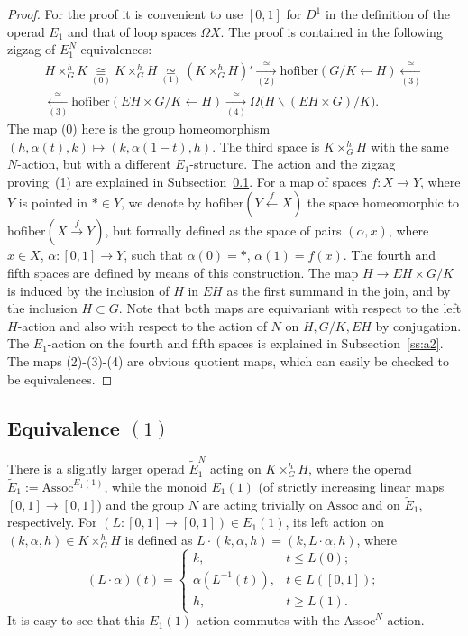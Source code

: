 \documentclass[11pt]{amsart}
\theoremstyle{definition}
\newcommand{\hofiber}{\mathrm{hofiber}}
\newcommand{\Assoc}{\mathrm{Assoc}}
\numberwithin{equation}{section}
\begin{document}
\begin{proof}
For the proof it is convenient to use $[0,1]$ for $D^1$  in the definition of the operad $E_1$ and that of loop spaces $\Omega X$. 
The proof is contained in the following zigzag of $E_1^N$-equivalences:
\begin{multline}\label{eq:zigzag_app}
H\times^h_G K\underset{(0)}{\cong} K\times^h_G H\underset{(1)}{\simeq}\left(K\times^h_G H\right)'\xrightarrow[(2)]{\simeq}
\hofiber\left(G/K\leftarrow H\right)\xleftarrow[(3)]{\simeq}\\
\xleftarrow[(3)]{\simeq}\hofiber\left(EH\times G/K\leftarrow H\right)\xrightarrow[(4)]{\simeq}\Omega\bigl(H\backslash (EH\times G)/K\bigr).
\end{multline}
The map (0) here is the group homeomorphism $(h,\alpha(t),k)\mapsto (k,\alpha(1-t),h)$. 
The third space is $K\times^h_G H$ with the same $N$-action, but with a different $E_1$-structure. The action and the zigzag
proving~(1)
are explained in Subsection~\ref{ss:a1}. For a map of spaces $f\colon X\to Y$, where $Y$ is pointed in $*\in Y$, we denote by
$\hofiber(Y\xleftarrow{f} X)$ the space homeomorphic to $\hofiber(X\stackrel{f}{\to} Y)$, but formally defined as the space of pairs $(\alpha,x)$,
where $x\in X$, $\alpha\colon [0,1]\to Y$, such that $\alpha(0)=*$, $\alpha(1)=f(x)$.
The fourth and fifth spaces are defined by means of this construction. The map $H\to EH\times G/K$ is induced by the inclusion
of $H$ in $EH$ as the first summand in the join, and by the inclusion $H\subset G$. Note that both maps are equivariant with respect to the left $H$-action and also with respect to the action of $N$ on $H, G/K, EH$ by conjugation. The $E_1$-action on the fourth and fifth spaces is explained in Subsection~\ref{ss:a2}. The maps (2)-(3)-(4) %
 are obvious quotient maps, which can easily be checked to be equivalences.
\end{proof}

\subsection{Equivalence $(1)$}\label{ss:a1}
There is a slightly larger operad $\tilde E_1^N$ acting on $K\times^h_G H$, where the operad $\tilde E_1:=\Assoc^{E_1(1)}$, 
while the monoid $E_1(1)$ (of strictly increasing linear maps $[0,1]\to[0,1]$) and the group $N$ are acting trivially on $\Assoc$ and on $\tilde E_1$, respectively. For $(L\colon [0,1]\to [0,1])\in E_1(1)$, its left action on $(k,\alpha,h)\in
K\times^h_G H$
is defined as $L\cdot (k,\alpha,h)=(k,L\cdot\alpha,h)$, where 
$$
(L\cdot\alpha)(t)=
\begin{cases}
k,&t\leq L(0);\\
\alpha(L^{-1}(t)),& t\in L([0,1]);\\
h,&t\geq L(1).
\end{cases}
$$
It is easy to see that this $E_1(1)$-action commutes with the $\Assoc^N$-action.
\end{document}
